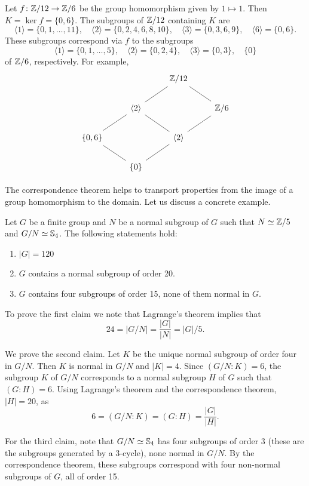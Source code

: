 

\begin{example}
\label{exa:Z12->Z6}
Let $f\colon\mathbb{Z}/12\to\mathbb{Z}/6$ be the group homomorphism given by 
$1\mapsto 1$. Then $K=\ker f=\{0,6\}$.
The subgroups of $\mathbb{Z}/12$ containing $K$ are
\[
\langle 1\rangle=\{0,1,\dots,11\},
\quad
\langle 2\rangle=\{0,2,4,6,8,10\},
\quad
\langle 3\rangle=\{0,3,6,9\},
\quad
\langle 6\rangle=\{0,6\}.
\]
These subgroups correspond via $f$ to
the subgroups
\[
\langle 1\rangle=\{0,1,\dots,5\},
\quad
\langle 2\rangle=\{0,2,4\},
\quad
\langle 3\rangle=\{0,3\},
\quad
\{0\}
\]
of $\mathbb{Z}/6$, respectively. 
For example, 
\[
\begin{tikzcd}
        && \Z/12 \\
        & \langle 2\rangle && {\Z/6} \\
        \{0,6\} && \langle 2\rangle \\
        & {\{0\}}
        \arrow[no head, from=1-3, to=2-4]
        \arrow[no head, from=1-3, to=2-2]
        \arrow[no head, from=2-2, to=3-1]
        \arrow[no head, from=3-1, to=4-2]
        \arrow[no head, from=2-2, to=3-3]
        \arrow[no head, from=3-3, to=4-2]
        \arrow[no head, from=2-4, to=3-3]
\end{tikzcd}
\]
\end{example}

The correspondence theorem helps to transport  
properties from the image of a group homomorphism 
to the domain. Let us discuss a concrete example. 

\begin{example}
Let $G$ be a finite group and $N$ be a normal subgroup of
$G$ such that $N\simeq\mathbb{Z}/5$ and $G/N\simeq\mathbb{S}_4$. The following statements hold: 
\begin{enumerate}
\item $|G|=120$
\item $G$ contains a normal subgroup of order 20.
\item $G$ contains four subgroups of order 15, none of them normal in $G$.
\end{enumerate}

To prove the first claim we note that 
Lagrange's theorem implies that 
\[
24=|G/N|=\frac{|G|}{|N|}=|G|/5.
\]

We prove the second claim. Let $K$ be the unique normal subgroup of order four in $G/N$. 
Then 
$K$ is normal in $G/N$ and $|K|=4$. Since 
$(G/N:K)=6$,
the subgroup $K$ of $G/N$ corresponds to a normal subgroup $H$ of $G$ such that $(G:H)=6$. Using Lagrange's theorem
and the correspondence theorem, 
$|H|=20$, as 
\[
6=(G/N:K)=(G:H)=\frac{|G|}{|H|}.
\]

For the third claim, note that
$G/N\simeq\mathbb{S}_4$ has four subgroups of order 
 3 (these are the subgroups generated by a 3-cycle),
none normal in $G/N$. By the correspondence theorem, these
subgroups correspond with four non-normal subgroups of $G$, all of order 15. 
\end{example}

